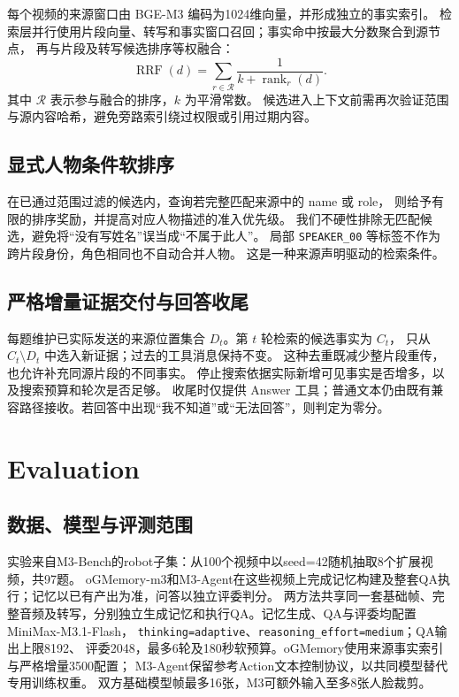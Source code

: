 \documentclass[UTF8,a4paper,11pt,fontset=fandol]{ctexart}
\DeclareRobustCommand{\code}[1]{\nolinkurl{#1}}
\newcommand*{\memoryprojectname}{oGMemory}
\newcommand*{\memoryprojectnamemthree}{\memoryprojectname-m3}
\begin{document}
每个视频的来源窗口由 BGE-M3 编码为1024维向量，并形成独立的事实索引。
检索层并行使用片段向量、转写和事实窗口召回；事实命中按最大分数聚合到源节点，
再与片段及转写候选排序等权融合：
\[
 \operatorname{RRF}(d)=\sum_{r\in\mathcal{R}}\frac{1}{k+\operatorname{rank}_{r}(d)}.
\]
其中 $\mathcal{R}$ 表示参与融合的排序，$k$ 为平滑常数。
候选进入上下文前需再次验证范围与源内容哈希，避免旁路索引绕过权限或引用过期内容。

\subsection{显式人物条件软排序}
在已通过范围过滤的候选内，查询若完整匹配来源中的 name 或 role，
则给予有限的排序奖励，并提高对应人物描述的准入优先级。
我们不硬性排除无匹配候选，避免将“没有写姓名”误当成“不属于此人”。
局部 \code{SPEAKER_00} 等标签不作为跨片段身份，角色相同也不自动合并人物。
这是一种来源声明驱动的检索条件。

\subsection{严格增量证据交付与回答收尾}
每题维护已实际发送的来源位置集合 $D_t$。第 $t$ 轮检索的候选事实为 $C_t$，
只从 $C_t\setminus D_t$ 中选入新证据；过去的工具消息保持不变。
这种去重既减少整片段重传，也允许补充同源片段的不同事实。
停止搜索依据实际新增可见事实是否增多，以及搜索预算和轮次是否足够。
收尾时仅提供 Answer 工具；普通文本仍由既有兼容路径接收。若回答中出现“我不知道”或“无法回答”，则判定为零分。

\section{Evaluation}
\subsection{数据、模型与评测范围}
实验来自M3-Bench\cite{m3agent}的robot子集：从100个视频中以seed=42随机抽取8个扩展视频，共97题。
\memoryprojectnamemthree{}和M3-Agent在这些视频上完成记忆构建及整套QA执行；记忆以已有产出为准，问答以独立评委判分。
两方法共享同一套基础帧、完整音频及转写，分别独立生成记忆和执行QA。记忆生成、QA与评委均配置MiniMax-M3.1-Flash，
\code{thinking=adaptive}、\code{reasoning_effort=medium}；QA输出上限8192、
评委2048，最多6轮及180秒软预算。\memoryprojectname{}使用来源事实索引与严格增量3500配置；
M3-Agent保留参考Action文本控制协议，以共同模型替代专用训练权重。
双方基础模型帧最多16张，M3可额外输入至多8张人脸裁剪。
\end{document}
